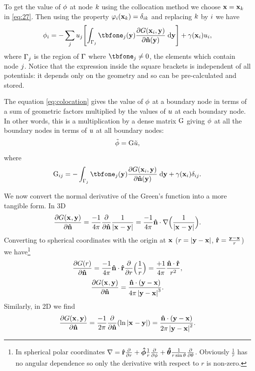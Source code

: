 To get the value of $\phi$ at node ${k}$ using the collocation method we choose $\boldsymbol{\mathrm{x}} = \boldsymbol{\mathrm{x}}_{k}$ in \cref{eq:27}.
Then using the property $\varphi_{i}(\boldsymbol{\mathrm{x}}_{k}) = \delta_{{i} {k}}$ and replacing ${k}$ by ${i}$ we have
\begin{equation}
  \phim_{\ibasis} =
  - \sum_\ibasisb \phione_{\ibasisb}  \bigs{\int_{\boundd_\ibasisb} \tbfone_{\ibasisb}(\yv)
  \pd{\Green[\ibasis]}{\nv(\yv)} \d \yv}
   + \gamma(\xv_\ibasis) \phione_{\ibasis},
  \label{eq:colocation}
\end{equation}
where ${{\Gamma}_{j}}$ is the region of ${\Gamma}$ where $\tbfone_{\ibasisb} \neq 0$, \ie the elements which contain node ${j}$.
Notice that the expression inside the square brackets is independent of all potentials: it depends only on the geometry and so can be pre-calculated and stored.


The equation \cref{eq:colocation} gives the value of $\phi$ at a boundary node in terms of a sum of geometric factors multiplied by the values of $u$ at each boundary node.
In other words, this is a multiplication by a dense matrix ${\mathbf{\mathrm{G}}}$ giving $\phi$ at all the boundary nodes in terms of $u$ at all boundary nodes:
\begin{equation}
  \label{eq:10}
  \phimdis = \bm \phionedis,
\end{equation}
where
\begin{equation}
  \label{eq:17}
  \bm_{\ibasis\ibasisb} = - \int_{\boundd_\ibasisb} \tbfone_{\ibasisb}(\yv) \pd{\Green[\ibasis]}{\nv(\yv)} \d \yv
   + \gamma(\xv_\ibasis)\delta_{\ibasis\ibasisb}.
\end{equation}

We now convert the normal derivative of the Green's function into a more tangible form.
In 3D
\begin{equation}
  \label{eq:11}
  \pd{\Green}{\nv} = \frac{-1}{4 \pi} \pd{}{\nv} \Gthreed = \frac{-1}{4 \pi} \nv \cdot \grad \Big( \Gthreed \Big).
\end{equation}
Converting to spherical coordinates with the origin at $\boldsymbol{\mathrm{x}}$ ($r = \left|{\boldsymbol{\mathrm{y}} - \boldsymbol{\mathrm{x}}} \right|$, $\boldsymbol{\mathrm{\hat{r}}} = \frac{\boldsymbol{\mathrm{y}} - \boldsymbol{\mathrm{x}}}{r}$) we have\footnote{In spherical polar coordinates $\nabla = \boldsymbol{\mathrm{\hat{r}}} \frac{\partial }{\partial r} +  \boldsymbol{\mathrm{\hat{\phi}}} \frac{1}{r} \frac{\partial }{\partial \phi} + \boldsymbol{\mathrm{\hat{\theta}}} \frac{1}{r \sin \theta} \frac{\partial }{\partial \theta}$.
Obviously $\frac{1}{r}$ has no angular dependence so only the derivative with respect to $r$ is non-zero.}
\begin{equation}
  \label{eq:12}
  \pd{G(r)}{\nv} = \frac{-1}{4 \pi} \nv \cdot \ruv \pd{}{r} \Big( \frac{1}{r} \Big)
  = \frac{+1}{4 \pi}  \frac{\nv \cdot \ruv}{r^2},
\end{equation}
\begin{equation}
  \label{eq:13}
  \pd{\Green}{\nv} = \frac{\nv \cdot (\yv - \xv)}{4 \pi \abs{\yv - \xv} ^3} .
\end{equation}
Similarly, in 2D we find
\begin{equation}
  \label{eq:14}
  \pd{\Green}{\nv} = \frac{-1}{2 \pi} \pd{}{\nv} (\Gtwod) = \frac{\nv \cdot (\yv - \xv)}{2 \pi \abs{\yv - \xv}^2}.
\end{equation}

